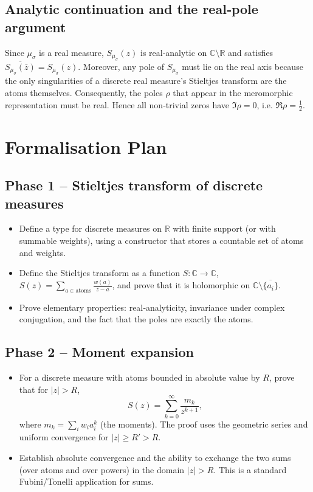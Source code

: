 \documentclass[12pt,a4paper]{article}
\begin{document}
\subsection{Analytic continuation and the real‑pole argument}
Since $\mu_\sigma$ is a real measure, $S_{\mu_\sigma}(z)$ is real‑analytic on 
$\mathbb{C} \setminus \mathbb{R}$ and satisfies $\overline{S_{\mu_\sigma}(\bar z)} = 
S_{\mu_\sigma}(z)$.  Moreover, any pole of $S_{\mu_\sigma}$ must lie on the real axis 
because the only singularities of a discrete real measure's Stieltjes transform are 
the atoms themselves.  Consequently, the poles $\rho$ that appear in the meromorphic 
representation must be real.  Hence all non‑trivial zeros have $\Im \rho = 0$, i.e. 
$\Re \rho = \frac12$.

\section{Formalisation Plan}

\subsection{Phase 1 – Stieltjes transform of discrete measures}
\begin{itemize}
    \item Define a type for discrete measures on $\mathbb{R}$ with finite support 
          (or with summable weights), using a constructor that stores a countable set 
          of atoms and weights.
    \item Define the Stieltjes transform as a function $S: \mathbb{C} \to \mathbb{C}$,
          $\displaystyle S(z) = \sum_{a \in \text{atoms}} \frac{w(a)}{z - a}$, and 
          prove that it is holomorphic on $\mathbb{C} \setminus \overline{\{a_i\}}$.
    \item Prove elementary properties: real‑analyticity, invariance under complex 
          conjugation, and the fact that the poles are exactly the atoms.
\end{itemize}

\subsection{Phase 2 – Moment expansion}
\begin{itemize}
    \item For a discrete measure with atoms bounded in absolute value by $R$, prove 
          that for $|z| > R$,
          \[
          S(z) = \sum_{k=0}^\infty \frac{m_k}{z^{k+1}},
          \]
          where $m_k = \sum_i w_i a_i^k$ (the moments).  The proof uses the geometric 
          series and uniform convergence for $|z| \ge R' > R$.
    \item Establish absolute convergence and the ability to exchange the two sums 
          (over atoms and over powers) in the domain $|z| > R$.  This is a standard 
          Fubini/Tonelli application for sums.
\end{itemize}
\end{document}
